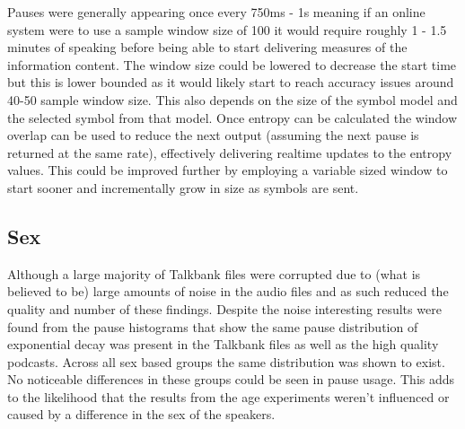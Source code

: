 Pauses were generally appearing once every 750ms - 1s meaning if an online system were to use a sample window size of 100 it would require roughly 1 - 1.5 minutes of speaking before being able to start delivering measures of the information content. The window size could be lowered to decrease the start time but this is lower bounded as it would likely start to reach accuracy issues around 40-50 sample window size. This also depends on the size of the symbol model and the selected symbol from that model. Once entropy can be calculated the window overlap can be used to reduce the next output (assuming the next pause is returned at the same rate), effectively delivering realtime updates to the entropy values. This could be improved further by employing a variable sized window to start sooner and incrementally grow in size as symbols are sent. \\


\subsection{Sex}
Although a large majority of Talkbank files were corrupted due to (what is believed to be) large amounts of noise in the audio files and as such reduced the quality and number of these findings. Despite the noise interesting results were found from the pause histograms that show the same pause distribution of exponential decay was present in the Talkbank files as well as the high quality podcasts. Across all sex based groups the same distribution was shown to exist. No noticeable differences in these groups could be seen in pause usage. This adds to the likelihood that the results from the age experiments weren't influenced or caused by a difference in the sex of the speakers.




